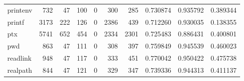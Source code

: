 \begin{tabular}{lrrrrrrrrr}
printenv  &                                                732 &                                                 47 &                                                100 &                                                  0 &                                                300 &                                                285 &                                           0.730874 &                               0.935792 &                             0.389344 \\
printf    &                                               3173 &                                                222 &                                                126 &                                                  0 &                                               2386 &                                                439 &                                           0.712260 &                               0.930035 &                             0.138355 \\
ptx       &                                               5741 &                                                652 &                                                454 &                                                  0 &                                               2334 &                                               2301 &                                           0.725483 &                               0.886431 &                             0.400801 \\
pwd       &                                                863 &                                                 47 &                                                111 &                                                  0 &                                                308 &                                                397 &                                           0.759849 &                               0.945539 &                             0.460023 \\
readlink  &                                                948 &                                                 47 &                                                117 &                                                  0 &                                                333 &                                                451 &                                           0.770042 &                               0.950422 &                             0.475738 \\
realpath  &                                                844 &                                                 47 &                                                121 &                                                  0 &                                                329 &                                                347 &                                           0.739336 &                               0.944313 &                             0.411137 \\

\end{tabular}
